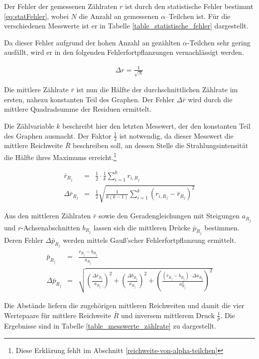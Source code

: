 \documentclass[12pt,a4paper]{scrartcl}
\numberwithin{equation}{section} %
\begin{document}
Der Fehler der gemessenen Zählraten $r$ ist durch den statistische Fehler bestimmt \eqref{eq:statFehler}, wobei $N$ die Anzahl an gemessenen $\alpha$--Teilchen ist. Für die verschiedenen Messwerte ist er in Tabelle \ref{table_statistische_fehler} dargestellt.

Da dieser Fehler aufgrund der hohen Anzahl an gezählten $\alpha$-Teilchen sehr gering ausfällt, wird er in den folgenden Fehlerfortpflanzungen vernachlässigt werden.

\begin{eqnarray}
	\Delta r = \frac{1}{\sqrt{N}}
	\label{eq:statFehler}
\end{eqnarray}

Die mittlere Zählrate $\bar{r}$ ist nun die Hälfte der durchschnittlichen Zählrate im ersten, nahezu konstanten Teil des Graphen. Der Fehler $\Delta \bar{r}$ wird durch die mittlere Quadradsumme der Residuen ermittelt.

Die Zählvariable $k$ beschreibt hier den letzten Messwert, der den konstanten Teil des Graphen ausmacht. Der Faktor $\frac{1}{2}$ ist notwendig, da dieser Messwert die mittlere Reichweite $\bar R$ beschreiben soll, an dessen Stelle die Strahlungsintensität die Hälfte ihres Maximums erreicht.\footnote{Diese Erklärung fehlt im Abschnitt \ref{reichweite-von-alpha-teilchen}}

\begin{eqnarray}
	\bar{r}_{R_j} &=& \frac{1}{2} \cdot \frac{1}{k} \sum_{i=1}^{k} r_{i,R_j} \\
	\Delta \bar{r}_{R_j} &=& \frac{1}{2} \sqrt{\frac{1}{k (k-1)} \sum_{i=1}^{k} (r_{i,R_j} - \bar{r}_{R_j})^2}
\end{eqnarray}

Aus den mittleren Zählraten $\bar r$ sowie den Geradengleichungen mit Steigungen $a_{R_j}$ und $r$-Achsenabschnitten $b_{R_j}$ lassen sich die mittleren Drücke $\bar{p}_{R_j}$ bestimmen. Deren Fehler $\Delta \bar p_{R_j}$ werden mittels Gauß'scher Fehlerfortpflanzung ermittelt.
\begin{eqnarray}
	\bar{p}_{R_j} &=& \frac{\bar{r}_{R_j} - b_{R_j}}{a_{R_j}} \\
	\Delta \bar{p}_{R_j} &=& \sqrt{\left(\frac{\Delta \bar{r}_{R_j}}{a_{R_j}}\right)^2 + \left(\frac{\Delta b_{R_j}}{a_{R_j}}\right)^2 + \left(\frac{(\bar{r}_{R_j} - b_{R_j}) \cdot \Delta a_{R_j}}{a_{R_j}^2}\right)^2}
\end{eqnarray}

Die Abstände liefern die zugehörigen mittleren Reichweiten und damit die vier Wertepaare für mittlere Reichweite $\bar{R}$ und inversem mittlerem Druck $\frac{1}{\bar{p}}$. Die Ergebnisse sind in Tabelle \ref{table_messwerte_zählrate} zu dargestellt.
\end{document}
